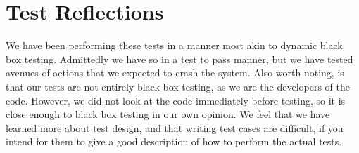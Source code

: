 \section{Test Reflections}
We have been performing these tests in a manner most akin to dynamic black box testing.
Admittedly we have so in a test to pass manner, but we have tested avenues of actions that we expected to crash the system.
Also worth noting, is that our tests are not entirely black box testing, as we are the developers of the code. 
However, we did not look at the code immediately before testing, so it is close enough to black box testing in our own opinion.
We feel that we have learned more about test design, and that writing test cases are difficult, if you intend for them to give a good description of how to perform the actual tests.